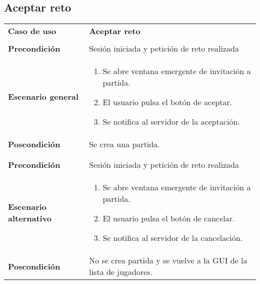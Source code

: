 \subsection{Aceptar reto}
{\footnotesize
\begin{tabularx}{0.95\textwidth}{p{}|X}

\textbf{Caso de uso} & \textbf{Aceptar reto} \\
& \\
\textbf{Precondición} & Sesión iniciada y petición de reto realizada\\

\textbf{Escenario general} & \begin{enumerate}
\item Se abre ventana emergente de invitación a partida.
\item El usuario pulsa el botón de aceptar.
\item Se notifica al servidor de la aceptación.
\end{enumerate} \\

\textbf{Poscondición} & Se crea una partida.\\
& \\
& \\
\textbf{Precondición} & Sesión iniciada y petición de reto realizada\\
\textbf{Escenario alternativo} & \begin{enumerate}
\item Se abre ventana emergente de invitación a partida.
\item El usuario pulsa el botón de cancelar.
\item Se notifica al servidor de la cancelación.
\end{enumerate}\\

\textbf{Poscondición}& No se crea partida y se vuelve a la GUI de la lista de jugadores.

\end{tabularx}
}

